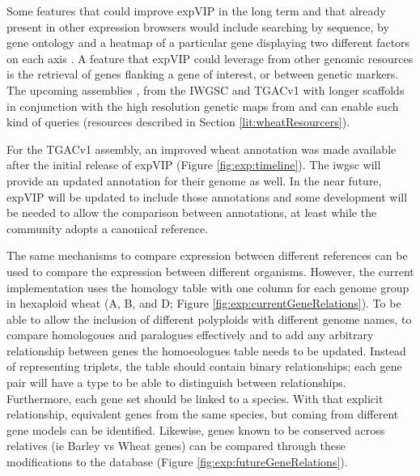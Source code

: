 Some features that could improve expVIP in the long term and that already present in other expression browsers would include searching by sequence, by gene ontology and a heatmap of a particular gene displaying two different factors on each axis . 
A feature that expVIP could leverage from other genomic resources is the retrieval of genes flanking a gene of interest, or between genetic markers. 
The upcoming assemblies , from the IWGSC \citep{Clark2016} and TGACv1 \citep{Pozniak2016}  with longer scaffolds in conjunction with the high resolution genetic maps from \citet{Wang2014} and \citet{Chapman2015} can enable such kind of queries (resources described in Section \ref{lit:wheatResourcers}). 

For the TGACv1 assembly, an improved wheat annotation was made available after the initial release of expVIP (Figure \ref{fig:exp:timeline}). The \acrshort{iwgsc} will provide an updated annotation for their genome as well. 
In the near future, expVIP will be updated to include those annotations and some development will be needed to allow the comparison between annotations, at least while the community adopts a canonical reference. 

The same mechanisms to compare expression between different references can be used to compare the expression between different organisms. 
However, the current implementation uses the homology table with one column for each genome group in hexaploid wheat (A, B, and D; Figure \ref{fig:exp:currentGeneRelations}). 
To be able to allow the inclusion of different polyploids with different genome names, to compare homologoues and paralogues effectively and to add any arbitrary relationship between genes the homoeologues table needs to be updated. 
Instead of representing triplets, the table should contain binary relationships; each gene pair will have a type to be able to distinguish between relationships. 
Furthermore, each gene set should be linked to a species. 
With that explicit relationship, equivalent genes from the same species, but coming from different gene models can be identified. 
Likewise, genes known to be conserved across relatives (ie Barley vs Wheat genes) can be compared through these modifications to the database (Figure \ref{fig:exp:futureGeneRelations}).  

